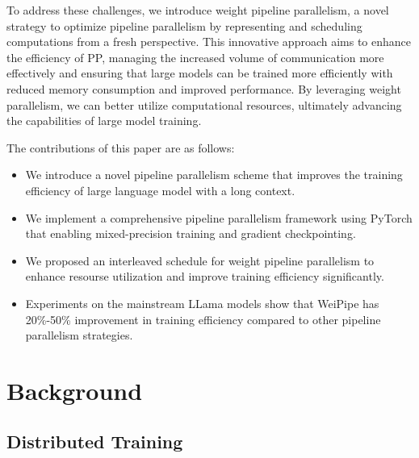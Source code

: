 \documentclass[sigplan,screen]{acmart}
\begin{document}
To address these challenges, we introduce weight pipeline parallelism, a novel strategy to optimize pipeline parallelism by representing and scheduling computations from a fresh perspective. This innovative approach aims to enhance the efficiency of PP, managing the increased volume of communication more effectively and ensuring that large models can be trained more efficiently with reduced memory consumption and improved performance. By leveraging weight parallelism, we can better utilize computational resources, ultimately advancing the capabilities of large model training. 

The contributions of this paper are as follows:

\begin{itemize}
    \item We introduce a novel pipeline parallelism scheme that improves the training efficiency of large language model with a long context.
    \item We implement a comprehensive pipeline parallelism framework using PyTorch that enabling mixed-precision training and gradient checkpointing.
    \item We proposed an interleaved schedule for weight pipeline parallelism to enhance resourse utilization and improve training efficiency significantly.
    \item Experiments on the mainstream LLama models show that WeiPipe has 20\%-50\% improvement in training efficiency compared to other pipeline parallelism strategies.
\end{itemize}


\section{Background}
\subsection{Distributed Training}
\end{document}
